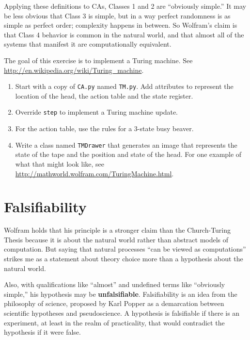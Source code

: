 \documentclass[10pt]{book}
\begin{document}
Applying these definitions to CAs, Classes 1 and 2 are ``obviously
simple.''  It may be less obvious that Class 3 is simple, but in a way
perfect randomness is as simple as perfect order; complexity happens
in between.  So Wolfram's claim is that Class 4 behavior is common in
the natural world, and that almost all of the systems that manifest it
are computationally equivalent.

\begin{ex}

The goal of this exercise is to implement a Turing machine.
See \url{http://en.wikipedia.org/wiki/Turing_machine}.

\begin{enumerate}

\item Start with a copy of {\tt CA.py} named {\tt TM.py}.
Add attributes to represent the location of the head, the action
table and the state register.

\item Override {\tt step} to implement a Turing machine update.

\item For the action table, use the rules for a 3-state busy beaver.

\item Write a class named {\tt TMDrawer} that generates an
image that represents the state of the tape and the position and
state of the head.  For one example of what that might look like,
see \url{http://mathworld.wolfram.com/TuringMachine.html}.

\end{enumerate}

\end{ex}


\section{Falsifiability}

Wolfram holds that his principle is a stronger claim than the
Church-Turing Thesis because it is about the natural world rather
than abstract models of computation.  But saying that natural processes
``can be viewed as computations'' strikes me as a statement about
theory choice more than a hypothesis about the natural world.

Also, with qualifications like
``almost'' and undefined terms like ``obviously simple,'' his
hypothesis may be {\bf unfalsifiable}.  Falsifiability is
an idea from the philosophy of science, proposed by Karl Popper
as a demarcation between scientific hypotheses and pseudoscience.
A hypothesis is falsifiable if there is an experiment, at least
in the realm of practicality, that would contradict the hypothesis
if it were false.
\end{document}
